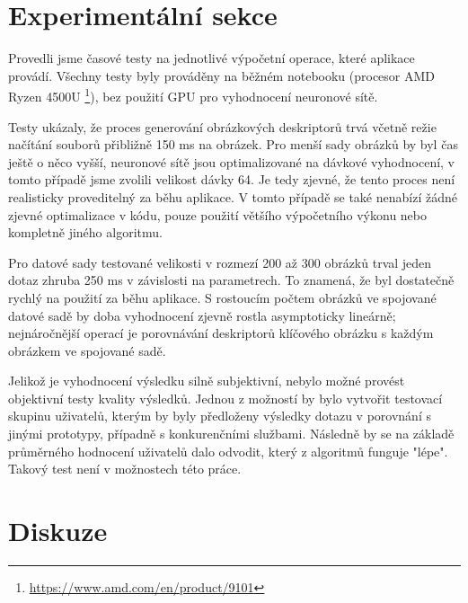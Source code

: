 \documentclass[12pt]{article}
\begin{document}
\section{Experimentální sekce}\label{sec:experimentalni-sekce}


Provedli jsme časové testy na jednotlivé výpočetní operace, které aplikace provádí.
Všechny testy byly prováděny na běžném notebooku (procesor AMD Ryzen 4500U%
\footnote{\url{https://www.amd.com/en/product/9101}}),
bez použití GPU pro vyhodnocení neuronové sítě.

Testy ukázaly, že proces generování obrázkových deskriptorů trvá včetně režie načítání souborů přibližně 150 ms na obrázek.
Pro menší sady obrázků by byl čas ještě o něco vyšší, neuronové sítě jsou optimalizované na dávkové vyhodnocení, v tomto případě jsme zvolili velikost dávky 64.
Je tedy zjevné, že tento proces není realisticky proveditelný za běhu aplikace.
V tomto případě se také nenabízí žádné zjevné optimalizace v kódu, pouze použití většího výpočetního výkonu nebo kompletně jiného algoritmu.

Pro datové sady testované velikosti v rozmezí 200 až 300 obrázků trval jeden dotaz zhruba 250 ms v závislosti na parametrech.
To znamená, že byl dostatečně rychlý na použití za běhu aplikace.
S rostoucím počtem obrázků ve spojované datové sadě by doba vyhodnocení zjevně rostla asymptoticky lineárně; nejnáročnější operací je porovnávání deskriptorů klíčového obrázku s každým obrázkem ve spojované sadě.

Jelikož je vyhodnocení výsledku silně subjektivní, nebylo možné provést objektivní testy kvality výsledků.
Jednou z možností by bylo vytvořit testovací skupinu uživatelů, kterým by byly předloženy výsledky dotazu v porovnání s jinými prototypy, případně s konkurenčními službami.
Následně by se na základě průměrného hodnocení uživatelů dalo odvodit, který z algoritmů funguje "lépe".
Takový test není v možnostech této práce.

\section{Diskuze}
\end{document}
